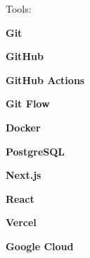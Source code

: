 \documentclass[9pt]{developercv} %
\begin{document}
\medskip

Tools:
\begin{itemize*}
  \item[] \textbf{Git}
  \item \textbf{GitHub}
  \item \textbf{GitHub Actions}
  \item \textbf{Git Flow}
  \item \textbf{Docker}
  \item \textbf{PostgreSQL}
  \item \textbf{Next.js}
  \item \textbf{React}
  \item \textbf{Vercel}
  \item \textbf{Google Cloud}
\end{itemize*}

\end{document}
